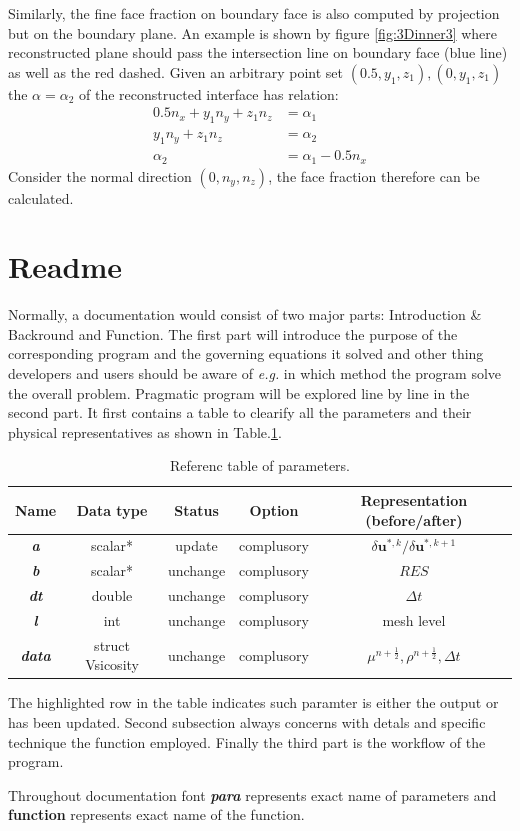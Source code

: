 \documentclass[a4paper]{article}
\newcommand{\func}[1]{\textbf{\textcolor{function}{#1}}}
\newcommand{\para}[1]{\textbf{\emph{\textcolor{para}{#1}}}}
\begin{document}
Similarly, the fine face fraction on boundary face is also computed by projection but on the boundary plane. An example is shown by figure \ref{fig:3Dinner3} where reconstructed plane should pass the intersection line on boundary face (blue line) as well as the red dashed. Given an arbitrary point set $(0.5,y_1,z_1),(0,y_1,z_1)$ the $\alpha=\alpha_2$ of the reconstructed interface has relation:
\begin{align}
    0.5n_x+y_1n_y+z_1n_z &= \alpha_1\\
    y_1n_y+z_1n_z &= \alpha_2\\
    \alpha_2 &= \alpha_1-0.5n_x
\end{align}
Consider the normal direction $(0,n_y,n_z)$, the face fraction therefore can be calculated.

\section{Readme}
Normally, a documentation would consist of two major parts: Introduction \& Backround and Function. The first part will introduce the purpose of the corresponding program and the governing equations it solved and other thing developers and users should be aware of \emph{e.g.} in which method the program solve the overall problem. Pragmatic program will be explored line by line in the second part. It first contains a table to clearify all the parameters and their physical representatives as shown in Table.\ref{tab:test}. 
\begin{table}[h]
  \centering
  \begin{tabular}{|c|c|c|c|c|}
    \hline
    Name & Data type & Status & Option & Representation (before/after)\\[0.5ex]
    \hline\hline
    \rowcolor{output} \para{a} & scalar* & update & complusory & $\delta \mathbf{u}^{*,k}/\delta \mathbf{u}^{*,k+1}$\\
    \hline
    \para{b} & scalar* & unchange & complusory & $RES$\\
    \hline
    \para{dt} & double & unchange & complusory & $\Delta t$\\
    \hline
    \para{l} & int & unchange & complusory &  mesh level \\
    \hline
    \para{data} & struct Vsicosity & unchange & complusory & $\mu^ {n+\frac{1}{2}}, \rho^{n+\frac{1}{2}}, \Delta t$ \\
    \hline
  \end{tabular}
  \caption{Referenc table of parameters.}
  \label{tab:test}
\end{table}
The highlighted row in the table indicates such paramter is either the output or has been updated. Second subsection always concerns with detals and specific technique the function employed. Finally the third part is the workflow of the program.\par
Throughout documentation font \para{para} represents exact name of parameters and \func{function} represents exact name of the function.
\end{document}
